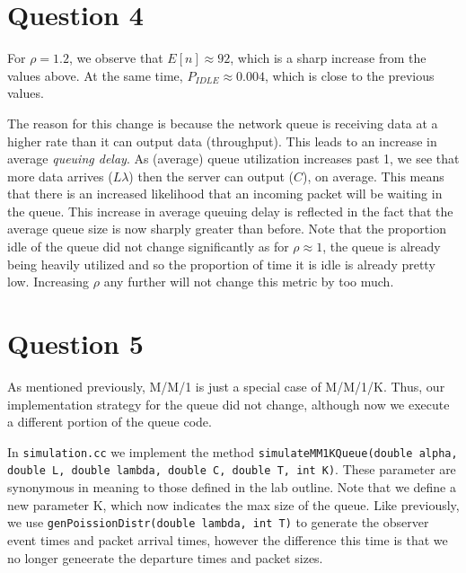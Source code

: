 \documentclass{article}
\begin{document}
\section{Question 4}
For $\rho = 1.2$, we observe that $E[n] \approx 92$, which is a sharp increase from the values above. At the same
time, $P_{IDLE} \approx 0.004$, which is close to the previous values. \newline

The reason for this change is because the network queue is receiving data at a higher rate than it can output data
(throughput). This leads to an increase in average \textit{queuing delay}. As (average) queue utilization increases past 1, we see
that more data arrives ($L\lambda$) then the server can output ($C$), on average. This means that there is an increased likelihood that an incoming packet will be
waiting in the queue. This increase in average queuing delay is reflected in the fact that the average queue size is now sharply greater than before. Note that the proportion
idle of the queue did not change significantly as for $\rho \approx 1$, the queue is already being heavily utilized and so the proportion of time it is idle is already
pretty low. Increasing $\rho$ any further will not change this metric by too much.

\section{Question 5}
As mentioned previously, M/M/1 is just a special case of M/M/1/K. Thus, our implementation strategy for the queue did not change, although now
we execute a different portion of the queue code. \newline

In \texttt{simulation.cc} we implement the method \texttt{simulateMM1KQueue(double alpha, double L, double lambda, double C, double T, int K)}. These parameter are
synonymous in meaning to those defined in the lab outline. Note that we define a new parameter K, which now indicates the max size of the queue. Like previously, we
use \texttt{genPoissionDistr(double lambda, int T)} to generate the observer event times and packet arrival times, however the difference this time is that we no longer geneerate the departure
times and packet sizes. \newline
\end{document}
